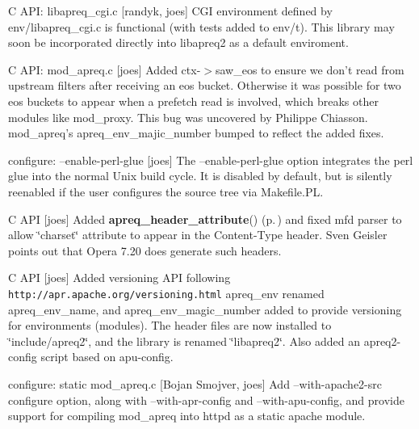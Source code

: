 \begin{CompactItemize}
\item 
C API: libapreq\_\-cgi.c [randyk, joes] CGI environment defined by env/libapreq\_\-cgi.c is functional (with tests added to env/t). This library may soon be incorporated directly into libapreq2 as a default enviroment.\end{CompactItemize}
\begin{CompactItemize}
\item 
C API: mod\_\-apreq.c [joes] Added ctx-$>$saw\_\-eos to ensure we don't read from upstream filters after receiving an eos bucket. Otherwise it was possible for two eos buckets to appear when a prefetch read is involved, which breaks other modules like mod\_\-proxy. This bug was uncovered by Philippe Chiasson. mod\_\-apreq's apreq\_\-env\_\-majic\_\-number bumped to reflect the added fixes.\end{CompactItemize}
\begin{CompactItemize}
\item 
configure: --enable-perl-glue [joes] The --enable-perl-glue option integrates the perl glue into the  normal Unix build cycle. It is disabled by default, but is silently  reenabled if the user configures the source tree via Makefile.PL.\end{CompactItemize}
\begin{CompactItemize}
\item 
C API [joes] Added {\bf apreq\_\-header\_\-attribute}() {\rm (p.\,\pageref{group__Utils_a23})} and fixed mfd parser to allow  \char`\"{}charset\char`\"{} attribute to appear in the Content-Type header. Sven Geisler points out that Opera 7.20 does generate such headers.\end{CompactItemize}
\begin{CompactItemize}
\item 
C API [joes] Added versioning API following {\tt http://apr.apache.org/versioning.html} apreq\_\-env renamed apreq\_\-env\_\-name, and apreq\_\-env\_\-magic\_\-number added to provide versioning for environments (modules). The header files  are now installed to \char`\"{}include/apreq2\char`\"{}, and the library is renamed  \char`\"{}libapreq2\char`\"{}. Also added an apreq2-config script based on apu-config.\end{CompactItemize}
\begin{CompactItemize}
\item 
configure: static mod\_\-apreq.c [Bojan Smojver, joes] Add --with-apache2-src configure option, along with --with-apr-config and --with-apu-config, and provide support for compiling mod\_\-apreq  into httpd as a static apache module.\end{CompactItemize}
